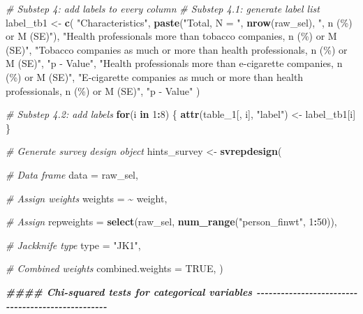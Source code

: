 \documentclass[
]{article}
\newenvironment{Shaded}{\begin{snugshade}}{\end{snugshade}}
\newcommand{\AttributeTok}[1]{\textcolor[rgb]{0.13,0.29,0.53}{#1}}
\newcommand{\CommentTok}[1]{\textcolor[rgb]{0.56,0.35,0.01}{\textit{#1}}}
\newcommand{\ConstantTok}[1]{\textcolor[rgb]{0.56,0.35,0.01}{#1}}
\newcommand{\ControlFlowTok}[1]{\textcolor[rgb]{0.13,0.29,0.53}{\textbf{#1}}}
\newcommand{\DecValTok}[1]{\textcolor[rgb]{0.00,0.00,0.81}{#1}}
\newcommand{\DocumentationTok}[1]{\textcolor[rgb]{0.56,0.35,0.01}{\textbf{\textit{#1}}}}
\newcommand{\FunctionTok}[1]{\textcolor[rgb]{0.13,0.29,0.53}{\textbf{#1}}}
\newcommand{\NormalTok}[1]{#1}
\newcommand{\OtherTok}[1]{\textcolor[rgb]{0.56,0.35,0.01}{#1}}
\newcommand{\SpecialCharTok}[1]{\textcolor[rgb]{0.81,0.36,0.00}{\textbf{#1}}}
\newcommand{\StringTok}[1]{\textcolor[rgb]{0.31,0.60,0.02}{#1}}
\begin{document}
\begin{Shaded}
\begin{Highlighting}[]
\CommentTok{\# Substep 4: add labels to every column}
\CommentTok{\# Substep 4.1: generate label list}
\NormalTok{label\_tb1 }\OtherTok{\textless{}{-}} \FunctionTok{c}\NormalTok{(}
  \StringTok{"Characteristics"}\NormalTok{,}
  \FunctionTok{paste}\NormalTok{(}\StringTok{"Total, N = "}\NormalTok{, }\FunctionTok{nrow}\NormalTok{(raw\_sel), }\StringTok{", n (\%) or M (SE)"}\NormalTok{),}
  \StringTok{"Health professionals more than tobacco companies, n (\%) or M (SE)"}\NormalTok{,}
  \StringTok{"Tobacco companies as much or more than health professionals, n (\%) or M (SE)"}\NormalTok{,}
  \StringTok{"p {-} Value"}\NormalTok{,}
  \StringTok{"Health professionals more than e{-}cigarette companies, n (\%) or M (SE)"}\NormalTok{,}
  \StringTok{"E{-}cigarette companies as much or more than health professionals, n (\%) or M (SE)"}\NormalTok{,}
  \StringTok{"p {-} Value"}
\NormalTok{)}

\CommentTok{\# Substep 4.2: add labels}
\ControlFlowTok{for}\NormalTok{(i }\ControlFlowTok{in} \DecValTok{1}\SpecialCharTok{:}\DecValTok{8}\NormalTok{) \{}
  \FunctionTok{attr}\NormalTok{(table\_1[, i], }\StringTok{"label"}\NormalTok{) }\OtherTok{\textless{}{-}}\NormalTok{ label\_tb1[i]}
\NormalTok{\}}

\CommentTok{\# Generate survey design object}
\NormalTok{hints\_survey }\OtherTok{\textless{}{-}} \FunctionTok{svrepdesign}\NormalTok{(}
  
  \CommentTok{\# Data frame}
  \AttributeTok{data =}\NormalTok{ raw\_sel,}
  
  \CommentTok{\# Assign weights}
  \AttributeTok{weights =} \SpecialCharTok{\textasciitilde{}}\NormalTok{ weight,}
  
  \CommentTok{\# Assign}
  \AttributeTok{repweights =} \FunctionTok{select}\NormalTok{(raw\_sel, }\FunctionTok{num\_range}\NormalTok{(}\StringTok{"person\_finwt"}\NormalTok{, }\DecValTok{1}\SpecialCharTok{:}\DecValTok{50}\NormalTok{)),}
  
  \CommentTok{\# Jackknife type}
  \AttributeTok{type =} \StringTok{"JK1"}\NormalTok{,}
  
  \CommentTok{\# Combined weights}
  \AttributeTok{combined.weights =} \ConstantTok{TRUE}\NormalTok{,}
\NormalTok{)}




\DocumentationTok{\#\#\#\# Chi{-}squared tests for categorical variables {-}{-}{-}{-}{-}{-}{-}{-}{-}{-}{-}{-}{-}{-}{-}{-}{-}{-}{-}{-}{-}{-}{-}{-}{-}{-}{-}{-}{-}{-}{-}{-}{-}{-}{-}{-}{-}{-}{-}{-}{-}{-}{-}{-}{-}{-}{-}{-}{-}{-}}



\end{Highlighting}
\end{Shaded}
\end{document}

